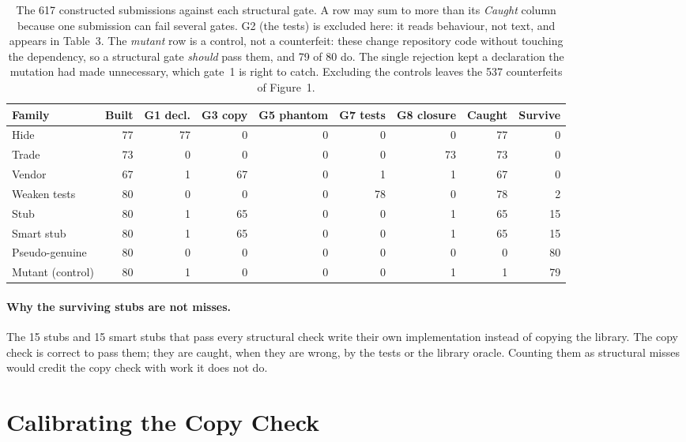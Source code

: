 \begin{table}[t]
\centering\small
\begin{tabular}{@{}lrrrrrrrr@{}}
\toprule
Family & Built & G1 decl. & G3 copy & G5 phantom & G7 tests & G8 closure & Caught & Survive \\
\midrule
Hide           & 77 & 77 &  0 & 0 &  0 &  0 & 77 & 0 \\
Trade          & 73 &  0 &  0 & 0 &  0 & 73 & 73 & 0 \\
Vendor         & 67 &  1 & 67 & 0 &  1 &  1 & 67 & 0 \\
Weaken tests   & 80 &  0 &  0 & 0 & 78 &  0 & 78 & 2 \\
Stub           & 80 &  1 & 65 & 0 &  0 &  1 & 65 & 15 \\
Smart stub     & 80 &  1 & 65 & 0 &  0 &  1 & 65 & 15 \\
Pseudo-genuine & 80 &  0 &  0 & 0 &  0 &  0 &  0 & 80 \\
\midrule
Mutant (control) & 80 & 1 & 0 & 0 & 0 & 1 & 1 & 79 \\
\bottomrule
\end{tabular}
\caption{The 617 constructed submissions against each structural gate.
A row may sum to more than its \emph{Caught} column because one
submission can fail several gates. G2 (the tests) is excluded here: it
reads behaviour, not text, and appears in Table~3. The \emph{mutant}
row is a control, not a counterfeit: these change repository code
without touching the dependency, so a structural gate \emph{should}
pass them, and 79 of 80 do. The single rejection kept a declaration the
mutation had made unnecessary, which gate~1 is right to catch. Excluding
the controls leaves the 537 counterfeits of Figure~1.}
\label{tab:per-gate}
\end{table}

\paragraph{Why the surviving stubs are not misses.}
The 15 stubs and 15 smart stubs that pass every structural check write
their own implementation instead of copying the library. The copy check
is correct to pass them; they are caught, when they are wrong, by the
tests or the library oracle. Counting them as structural misses would
credit the copy check with work it does not do.

\section{Calibrating the Copy Check}
\label{app:fingerprint}

